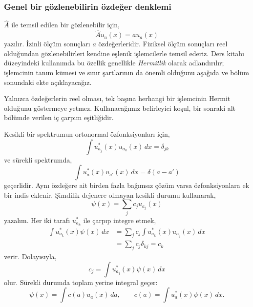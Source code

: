 \subsubsection{Genel bir gözlenebilirin özdeğer denklemi}

$\hat A$ ile temsil edilen bir gözlenebilir için,
\begin{equation}
 \hat A u_a(x)=a u_a(x)
 \label{eq:05_genel_ozdeger}
\end{equation}
yazılır. İzinli ölçüm sonuçları $a$ özdeğerleridir. Fiziksel ölçüm
sonuçları reel olduğundan gözlenebilirleri kendine eşlenik
işlemcilerle temsil ederiz. Ders kitabı düzeyindeki kullanımda bu
özellik genellikle \emph{Hermitlik} olarak adlandırılır; işlemcinin
tanım kümesi ve sınır şartlarının da önemli olduğunu aşağıda ve
bölüm sonundaki ekte açıklayacağız.

Yalnızca özdeğerlerin reel olması, tek başına herhangi bir işlemcinin
Hermit olduğunu göstermeye yetmez. Kullanacağımız belirleyici koşul,
bir sonraki alt bölümde verilen iç çarpım eşitliğidir.

Kesikli bir spektrumun ortonormal özfonksiyonları için,
\begin{equation}
 \int u_{a_j}^*(x)u_{a_k}(x)\,dx=\delta_{jk}
\end{equation}
ve sürekli spektrumda,
\begin{equation}
 \int u_a^*(x)u_{a'}(x)\,dx=\delta(a-a')
\end{equation}
geçerlidir. Aynı özdeğere ait birden fazla bağımsız çözüm varsa
özfonksiyonlara ek bir indis eklenir. Şimdilik dejenere olmayan
kesikli durumu kullanarak,
\begin{equation}
 \psi(x)=\sum_j c_j u_{a_j}(x)
 \label{eq:05_a_acilim}
\end{equation}
yazalım. Her iki tarafı $u_{a_k}^*$ ile çarpıp integre etmek,
\begin{align}
 \int u_{a_k}^*(x)\psi(x)\,dx
 &=\sum_j c_j\int u_{a_k}^*(x)u_{a_j}(x)\,dx\\
 &=\sum_j c_j\delta_{kj}=c_k
\end{align}
verir. Dolayısıyla,
\begin{equation}
 \boxed{c_j=\int u_{a_j}^*(x)\psi(x)\,dx}
 \label{eq:05_projeksiyon}
\end{equation}
olur. Sürekli durumda toplam yerine integral geçer:
\begin{equation}
 \psi(x)=\int c(a)u_a(x)\,da,
 \qquad c(a)=\int u_a^*(x)\psi(x)\,dx.
\end{equation}

